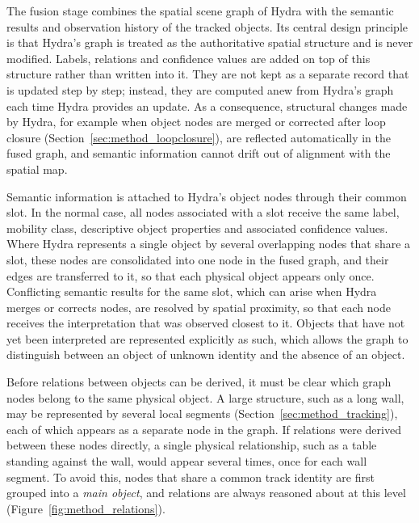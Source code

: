 {\small

The fusion stage combines the spatial scene graph of Hydra with the semantic results and observation history of the tracked objects. Its central design principle is that Hydra's graph is treated as the authoritative spatial structure and is never modified. Labels, relations and confidence values are added on top of this structure rather than written into it. They are not kept as a separate record that is updated step by step; instead, they are computed anew from Hydra's graph each time Hydra provides an update. As a consequence, structural changes made by Hydra, for example when object nodes are merged or corrected after loop closure (Section~\ref{sec:method_loopclosure}), are reflected automatically in the fused graph, and semantic information cannot drift out of alignment with the spatial map.

Semantic information is attached to Hydra's object nodes through their common slot. In the normal case, all nodes associated with a slot receive the same label, mobility class, descriptive object properties and associated confidence values. Where Hydra represents a single object by several overlapping nodes that share a slot, these nodes are consolidated into one node in the fused graph, and their edges are transferred to it, so that each physical object appears only once. Conflicting semantic results for the same slot, which can arise when Hydra merges or corrects nodes, are resolved by spatial proximity, so that each node receives the interpretation that was observed closest to it. Objects that have not yet been interpreted are represented explicitly as such, which allows the graph to distinguish between an object of unknown identity and the absence of an object.

Before relations between objects can be derived, it must be clear which graph nodes belong to the same physical object. A large structure, such as a long wall, may be represented by several local segments (Section~\ref{sec:method_tracking}), each of which appears as a separate node in the graph. If relations were derived between these nodes directly, a single physical relationship, such as a table standing against the wall, would appear several times, once for each wall segment. To avoid this, nodes that share a common track identity are first grouped into a \textit{main object}, and relations are always reasoned about at this level (Figure~\ref{fig:method_relations}).

 
 
}
